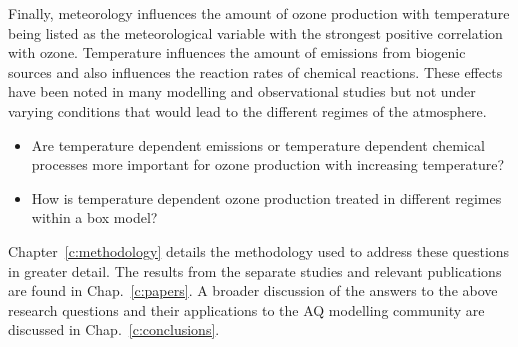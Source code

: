 Finally, meteorology influences the amount of ozone production with temperature being listed as the meteorological variable with the strongest positive correlation with ozone.
Temperature influences the amount of emissions from biogenic sources and also influences the reaction rates of chemical reactions.
These effects have been noted in many modelling and observational studies but not under varying  conditions that would lead to the different  regimes of the atmosphere.
\begin{itemize}
    \item Are temperature dependent emissions or temperature dependent chemical processes more important for ozone production with increasing temperature? 
    \item How is temperature dependent ozone production treated in different  regimes within a box model?
\end{itemize}

Chapter~\ref{c:methodology} details the methodology used to address these questions in greater detail.
The results from the separate studies and relevant publications are found in Chap.~\ref{c:papers}.
A broader discussion of the answers to the above research questions and their applications to the AQ modelling community are discussed in Chap.~\ref{c:conclusions}.
